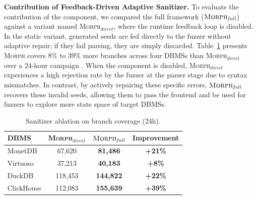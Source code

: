 \documentclass[conference]{IEEEtran}
\newcommand{\tool}{\textsc{Morph}\xspace}
\newcommand{\tooldisfuzzer}{\tool{}$_{direct}$\xspace}
\newcommand{\duckdb}{DuckDB\xspace}
\providecommand{\DIFaddtex}[1]{{\protect\color{blue}\uwave{#1}}} %
\providecommand{\DIFaddbegin}{} %
\providecommand{\DIFaddend}{} %
\providecommand{\DIFadd}[1]{\texorpdfstring{\DIFaddtex{#1}}{#1}} %
\providecommand{\DIFaddincludegraphics}[2][]{{\color{blue}\fbox{\DIFOincludegraphics[#1]{#2}}}} %
\DeclareRobustCommand{\DIFaddbegin}{\DIFOaddbegin \let\includegraphics\DIFaddincludegraphics} %
\DeclareRobustCommand{\DIFaddend}{\DIFOaddend \let\includegraphics\DIFOincludegraphics} %
\begin{document}
\DIFaddend \textbf{Contribution of Feedback-Driven Adaptive Sanitizer.}
To evaluate the contribution of the component, we compared the full framework ($\tool{}_{\textit{full}}$) against a variant named \tooldisfuzzer{}, where the runtime feedback loop is disabled. In the static variant, generated seeds are fed directly to the fuzzer without adaptive repair; if they fail parsing, they are simply discarded.
Table~\ref{tab:ablation_sanitizer} presents \tool{} covers 8\% to 39\% more branches across four DBMSs than \tooldisfuzzer{} over a 24-hour campaign \DIFaddbegin \DIFadd{($p<0.05$)}\DIFaddend .
When the component is disabled, \tooldisfuzzer{} experiences a high rejection rate by the fuzzer at the parser stage due to syntax mismatches.
In contrast, by actively repairing these specific errors, $\tool{}_{\textit{full}}$ recovers these invalid seeds, allowing them to pass the frontend and be used for fuzzers to explore more state space of target DBMSs. 



\begin{table}[!t]
\centering
\footnotesize
\caption{Sanitizer ablation on branch coverage (24h).}
\label{tab:ablation_sanitizer}
\setlength{\tabcolsep}{3pt}
\begin{tabular*}{\columnwidth}{@{\extracolsep{\fill}}lccc@{}}
\toprule
\textbf{DBMS} & \tooldisfuzzer{} & $\tool{}_{\textit{full}}$ & \textbf{Improvement} \\
\midrule
MonetDB    & 67,620 & \textbf{81,486}  & \textbf{+21\%} \\
Virtuoso   & 37,213 & \textbf{40,183}  & \textbf{+8\%} \\
DuckDB     & 118,453 & \textbf{144,822} & \textbf{+22\%} \\
ClickHouse & 112,083 & \textbf{155,639} & \textbf{+39\%} \\
\bottomrule
\end{tabular*}
\vspace{-0.8em}
\end{table}
\end{document}
